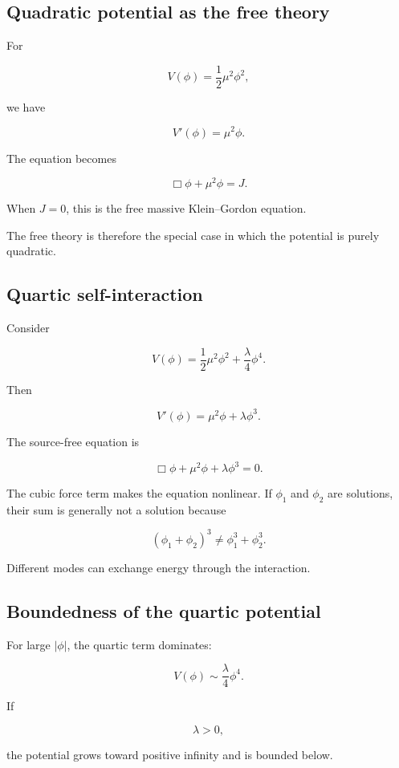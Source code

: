 \subsection{Quadratic potential as the free theory}

For

\[
V(\phi)
=
\frac{1}{2}\mu^{2}\phi^{2},
\]

we have

\[
V'(\phi)=\mu^{2}\phi.
\]

The equation becomes

\[
\Box\phi+\mu^{2}\phi=J.
\]

When \(J=0\), this is the free massive Klein--Gordon equation.

The free theory is therefore the special case in which the potential is purely quadratic.

\subsection{Quartic self-interaction}

Consider

\[
\boxed{
V(\phi)
=
\frac{1}{2}\mu^{2}\phi^{2}
+
\frac{\lambda}{4}\phi^{4}
}.
\]

Then

\[
V'(\phi)
=
\mu^{2}\phi
+
\lambda\phi^{3}.
\]

The source-free equation is

\[
\boxed{
\Box\phi
+
\mu^{2}\phi
+
\lambda\phi^{3}
=0
}.
\]

The cubic force term makes the equation nonlinear. If \(\phi_{1}\) and \(\phi_{2}\) are solutions, their sum is generally not a solution because

\[
(\phi_{1}+\phi_{2})^{3}
\neq
\phi_{1}^{3}+\phi_{2}^{3}.
\]

Different modes can exchange energy through the interaction.

\subsection{Boundedness of the quartic potential}

For large \(|\phi|\), the quartic term dominates:

\[
V(\phi)
\sim
\frac{\lambda}{4}\phi^{4}.
\]

If

\[
\lambda>0,
\]

the potential grows toward positive infinity and is bounded below.

